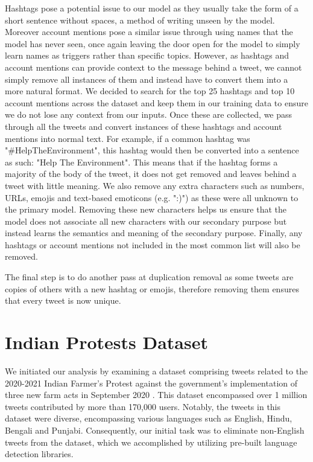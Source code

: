 Hashtags pose a potential issue to our model as they usually take the form of a short sentence without spaces, a method of writing unseen by the model. Moreover account mentions pose a similar issue through using names that the model has never seen, once again leaving the door open for the model to simply learn names as triggers rather than specific topics. However, as hashtags and account mentions can provide context to the message behind a tweet, we cannot simply remove all instances of them and instead have to convert them into a more natural format. We decided to search for the top 25 hashtags and top 10 account mentions across the dataset and keep them in our training data to ensure we do not lose any context from our inputs. Once these are collected, we pass through all the tweets and convert instances of these hashtags and account mentions into normal text. For example, if a common hashtag was "\#HelpTheEnvironment", this hashtag would then be converted into a sentence as such: "Help The Environment". This means that if the hashtag forms a majority of the body of the tweet, it does not get removed and leaves behind a tweet with little meaning. We also remove any extra characters such as numbers, URLs, emojis and text-based emoticons (e.g. ":)") as these were all unknown to the primary model. Removing these new characters helps us ensure that the model does not associate all new characters with our secondary purpose but instead learns the semantics and meaning of the secondary purpose. Finally, any hashtags or account mentions not included in the most common list will also be removed.

The final step is to do another pass at duplication removal as some tweets are copies of others with a new hashtag or emojis, therefore removing them ensures that every tweet is now unique.

\section{Indian Protests Dataset}
We initiated our analysis by examining a dataset comprising tweets related to the 2020-2021 Indian Farmer's Protest against the government's implementation of three new farm acts in September 2020 \cite{indian-protest-dataset}. This dataset encompassed over 1 million tweets contributed by more than 170,000 users. Notably, the tweets in this dataset were diverse, encompassing various languages such as English, Hindu, Bengali and Punjabi. Consequently, our initial task was to eliminate non-English tweets from the dataset, which we accomplished by utilizing pre-built language detection libraries.

